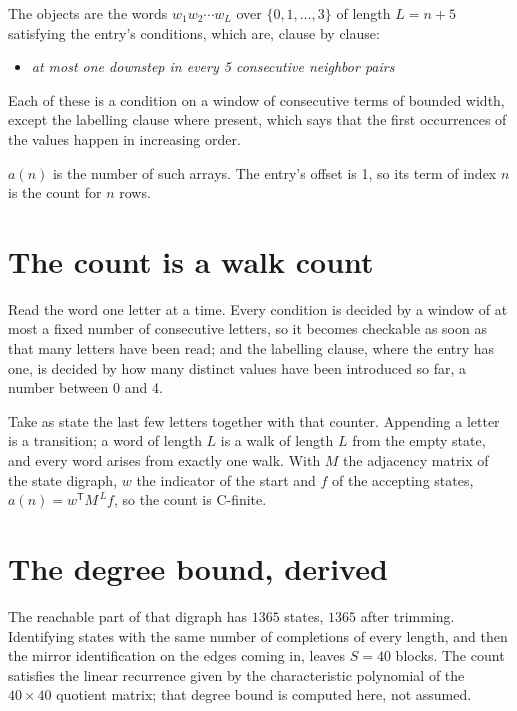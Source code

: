\documentclass[11pt]{article}
\theoremstyle{definition}
\begin{document}
The objects are the words $w_1 w_2 \cdots w_L$ over $\{0,1,\dots,3\}$ of length $L = n + 5$ satisfying the entry's conditions, which are, clause by clause:

\begin{itemize}

\item {\itshape at most one downstep in every 5 consecutive neighbor pairs}

\end{itemize}

Each of these is a condition on a window of consecutive terms of bounded width, except the labelling clause where present, which says that the first occurrences of the values happen in increasing order.

$a(n)$ is the number of such arrays. The entry's offset is 1, so its term of index $n$ is the count for $n$ rows.

\section{The count is a walk count}

Read the word one letter at a time. Every condition is decided by a window of at most a fixed number of consecutive letters, so it becomes checkable as soon as that many letters have been read; and the labelling clause, where the entry has one, is decided by how many distinct values have been introduced so far, a number between $0$ and 4.

Take as state the last few letters together with that counter. Appending a letter is a transition; a word of length $L$ is a walk of length $L$ from the empty state, and every word arises from exactly one walk. With $M$ the adjacency matrix of the state digraph, $w$ the indicator of the start and $f$ of the accepting states, $a(n) = w^{\mathsf T}M^{\,L}f$, so the count is C-finite.

\section{The degree bound, derived}

The reachable part of that digraph has $1365$ states, $1365$ after trimming. Identifying states with the same number of completions of every length, and then the mirror identification on the edges coming in, leaves $S = 40$ blocks. The count satisfies the linear recurrence given by the characteristic polynomial of the $40\times40$ quotient matrix; that degree bound is computed here, not assumed.
\end{document}
